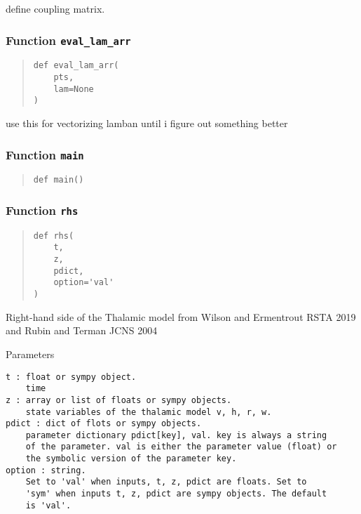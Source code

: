 \documentclass[english,a4paper,oneside]{article}
\begin{document}
define coupling matrix.

\hypertarget{Thalamic.eval_lam_arr}{%
\subsubsection{\texorpdfstring{Function
\texttt{eval\_lam\_arr}}{Function eval\_lam\_arr}}\label{Thalamic.eval_lam_arr}}

\begin{quote}
\begin{verbatim}
def eval_lam_arr(
    pts,
    lam=None
)
\end{verbatim}
\end{quote}

use this for vectorizing lamban until i figure out something better

\hypertarget{Thalamic.main}{%
\subsubsection{\texorpdfstring{Function
\texttt{main}}{Function main}}\label{Thalamic.main}}

\begin{quote}
\begin{verbatim}
def main()
\end{verbatim}
\end{quote}

\hypertarget{Thalamic.rhs}{%
\subsubsection{\texorpdfstring{Function
\texttt{rhs}}{Function rhs}}\label{Thalamic.rhs}}

\begin{quote}
\begin{verbatim}
def rhs(
    t,
    z,
    pdict,
    option='val'
)
\end{verbatim}
\end{quote}

Right-hand side of the Thalamic model from Wilson and Ermentrout RSTA
2019 and Rubin and Terman JCNS 2004

Parameters

\begin{verbatim}
t : float or sympy object.
    time
z : array or list of floats or sympy objects.
    state variables of the thalamic model v, h, r, w.
pdict : dict of flots or sympy objects.
    parameter dictionary pdict[key], val. key is always a string
    of the parameter. val is either the parameter value (float) or 
    the symbolic version of the parameter key.
option : string.
    Set to 'val' when inputs, t, z, pdict are floats. Set to
    'sym' when inputs t, z, pdict are sympy objects. The default
    is 'val'.
\end{verbatim}
\end{document}
